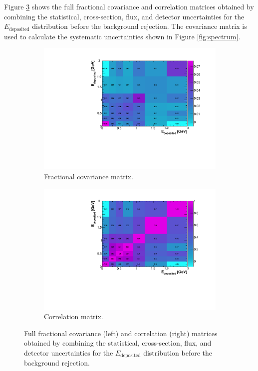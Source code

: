 Figure \ref{fig:sys_tot} shows the full fractional covariance and correlation matrices obtained by combining the statistical, cross-section, flux, and detector uncertainties for the $E_{\mathrm{deposited}}$ distribution before the background rejection. The covariance matrix is used to calculate the systematic uncertainties shown in Figure \ref{fig:spectrum}. 

\begin{figure}[htbp]
  \begin{center}
    \begin{subfigure}{0.49\textwidth}
      \includegraphics[width=\linewidth]{figures/h_frac_tot.pdf}
      \caption{Fractional covariance matrix.}  \label{fig:frac_tot}
    \end{subfigure}\hfill
    \begin{subfigure}{0.49\textwidth}
      \includegraphics[width=\linewidth]{figures/h_corr_tot.pdf}
      \caption{Correlation matrix.} \label{fig:corr_tot}
    \end{subfigure}
    \caption{Full fractional covariance (left) and correlation (right) matrices obtained by combining the statistical, cross-section, flux, and detector uncertainties for the $E_{\mathrm{deposited}}$ distribution before the background rejection.} \label{fig:sys_tot}
	\end{center}
\end{figure}